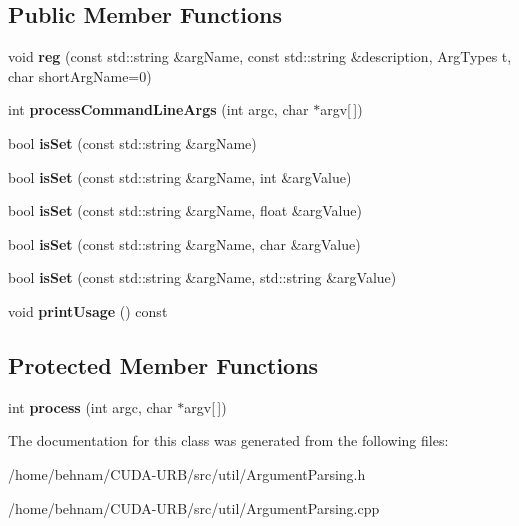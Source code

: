 \subsection*{Public Member Functions}
\begin{DoxyCompactItemize}
\item 
\mbox{\label{classArgumentParsing_a510548c4ed100184f99970ab68980424}} 
void {\bfseries reg} (const std\+::string \&arg\+Name, const std\+::string \&description, Arg\+Types t, char short\+Arg\+Name=0)
\item 
\mbox{\label{classArgumentParsing_af761b06eb7c86d92ffdf590db6ed0b46}} 
int {\bfseries process\+Command\+Line\+Args} (int argc, char $\ast$argv\mbox{[}$\,$\mbox{]})
\item 
\mbox{\label{classArgumentParsing_a696c167419b300f3b8161d36234131c7}} 
bool {\bfseries is\+Set} (const std\+::string \&arg\+Name)
\item 
\mbox{\label{classArgumentParsing_a2e9140007f6824a49b0e3fbe658cc3a0}} 
bool {\bfseries is\+Set} (const std\+::string \&arg\+Name, int \&arg\+Value)
\item 
\mbox{\label{classArgumentParsing_ac3572d336f0a9151dd5dc53bd208edb1}} 
bool {\bfseries is\+Set} (const std\+::string \&arg\+Name, float \&arg\+Value)
\item 
\mbox{\label{classArgumentParsing_a308f10dbeead11c73b7a1ffbf1c5274a}} 
bool {\bfseries is\+Set} (const std\+::string \&arg\+Name, char \&arg\+Value)
\item 
\mbox{\label{classArgumentParsing_a4e19fd0b5a9a26f106b64decd66610b8}} 
bool {\bfseries is\+Set} (const std\+::string \&arg\+Name, std\+::string \&arg\+Value)
\item 
\mbox{\label{classArgumentParsing_a9386d5a547050a15f344b049b167a628}} 
void {\bfseries print\+Usage} () const
\end{DoxyCompactItemize}
\subsection*{Protected Member Functions}
\begin{DoxyCompactItemize}
\item 
\mbox{\label{classArgumentParsing_ab8eaad07d0c28d6e6c9f6a68b7751714}} 
int {\bfseries process} (int argc, char $\ast$argv\mbox{[}$\,$\mbox{]})
\end{DoxyCompactItemize}


The documentation for this class was generated from the following files\+:\begin{DoxyCompactItemize}
\item 
/home/behnam/\+C\+U\+D\+A-\/\+U\+R\+B/src/util/Argument\+Parsing.\+h\item 
/home/behnam/\+C\+U\+D\+A-\/\+U\+R\+B/src/util/Argument\+Parsing.\+cpp\end{DoxyCompactItemize}
